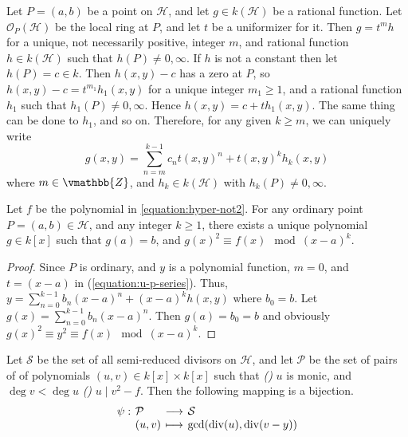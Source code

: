 Let $P = (a, b)$ be a point on $\mathcal{H}$, and let $g \in k(\mathcal{H})$ be a rational function. 
Let $\mathcal{O}_P(\mathcal{H})$ be the local ring at $P$, and let $t$ be a uniformizer for it. Then 
$g = t^mh$ for a unique, not necessarily positive, integer $m$, and rational function $h \in 
k(\mathcal{H})$ such that $h(P) \ne 0, \infty$. If $h$ is not a constant then let $h(P) = c \in k$. 
Then $h(x, y) - c$ has a zero at $P$, so $h(x, y) - c = t^{m_1}h_1(x, y)$ for a unique integer $m_1 
\ge 1$, and a rational function $h_1$ such that $h_1(P) \ne 0, \infty$. Hence $h(x, y) = c + th_1(x, 
y)$. The same thing can be done to $h_1$, and so on. Therefore, for any given $k \ge m$, we can 
uniquely write 
\begin{equation}
\label{equation:u-p-series}
g(x, y) = \sum_{n = m}^{k - 1} c_nt(x, y)^n + t(x, y)^kh_k(x, y)
\end{equation}
where $m \in \vmathbb{Z}$, and $h_k \in k(\mathcal{H})$ with $h_k(P) \ne 0, \infty$.
\begin{proposition}
\label{proposition:mum-sq}
Let $f$ be the polynomial in \ref{equation:hyper-not2}. For any ordinary point $P = (a, b) \in 
\mathcal{H}$, and any integer $k \ge 1$, there exists a unique polynomial $g \in k[x]$ such that 
$g(a) = b$, and $g(x)^2 \equiv f(x) \mod {(x - a)^k}$.
\end{proposition}
\begin{proof}
Since $P$ is ordinary, and $y$ is a polynomial function, $m = 0$, and $t = (x - a)$ in 
(\ref{equation:u-p-series}). Thus, $y = \sum_{n = 0}^{k - 1} b_n(x - a)^n + (x - a)^kh(x, y)$ where 
$b_0 = b$. Let $g(x) = \sum_{n = 0}^{k - 1} b_n(x - a)^n$. Then $g(a) = b_0 = b$ and obviously 
$g(x)^2 \equiv y^2 \equiv f(x) \mod (x - a)^k$.
\end{proof}
\begin{theorem}
\label{theorem:mum-rep}
Let $\mathcal{S}$ be the set of all semi-reduced divisors on $\mathcal{H}$, and let $\mathcal{P}$ be 
the set of pairs of of polynomials $(u, v) \in k[x] \times k[x]$ such that \emph{()} $u$ 
is monic, and $\deg v < \deg u$ \emph{()} $u \mid v^2 - f$. Then the following mapping is 
a bijection.
\begin{equation}
\label{equation:Mum-corr}
\setlength\arraycolsep{2pt}
\begin{array}{llll}
\psi: & \mathcal{P} & \longrightarrow & \mathcal{S} \\
& (u, v) & \longmapsto & \gcd(\divisor(u), \divisor(v - y))
\end{array}
\end{equation}
\end{theorem}
